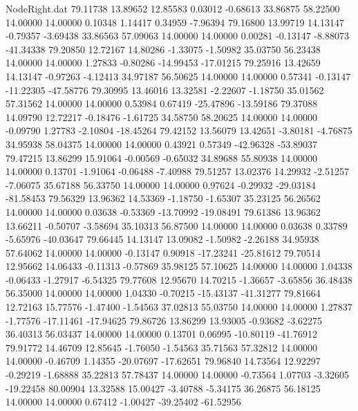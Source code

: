 \begin{filecontents}{NodeRight.dat}
  79.11738   13.89652   12.85583     0.03012   -0.68613   33.86875   58.22500   14.00000   14.00000    0.10348    1.14417    0.34959   -7.96394
  79.16800   13.99719   14.13147    -0.79357   -3.69438   33.86563   57.09063   14.00000   14.00000    0.00281   -0.13147   -8.88073  -41.34338
  79.20850   12.72167   14.80286    -1.33075   -1.50982   35.03750   56.23438   14.00000   14.00000    1.27833   -0.80286  -14.99453  -17.01215
  79.25916   13.42659   14.13147    -0.97263   -4.12413   34.97187   56.50625   14.00000   14.00000    0.57341   -0.13147  -11.22305  -47.58776
  79.30995   13.46016   13.32581    -2.22607   -1.18750   35.01562   57.31562   14.00000   14.00000    0.53984    0.67419  -25.47896  -13.59186
  79.37088   14.09790   12.72217    -0.18476   -1.61725   34.58750   58.20625   14.00000   14.00000   -0.09790    1.27783   -2.10804  -18.45264
  79.42152   13.56079   13.42651    -3.80181   -4.76875   34.95938   58.04375   14.00000   14.00000    0.43921    0.57349  -42.96328  -53.89037
  79.47215   13.86299   15.91064    -0.00569   -0.65032   34.89688   55.80938   14.00000   14.00000    0.13701   -1.91064   -0.06488   -7.40988
  79.51257   13.02376   14.29932    -2.51257   -7.06075   35.67188   56.33750   14.00000   14.00000    0.97624   -0.29932  -29.03184  -81.58453
  79.56329   13.96362   14.53369    -1.18750   -1.65307   35.23125   56.26562   14.00000   14.00000    0.03638   -0.53369  -13.70992  -19.08491
  79.61386   13.96362   13.66211    -0.50707   -3.58694   35.10313   56.87500   14.00000   14.00000    0.03638    0.33789   -5.65976  -40.03647
  79.66445   14.13147   13.09082    -1.50982   -2.26188   34.95938   57.64062   14.00000   14.00000   -0.13147    0.90918  -17.23241  -25.81612
  79.70514   12.95662   14.06433    -0.11313   -0.57869   35.98125   57.10625   14.00000   14.00000    1.04338   -0.06433   -1.27917   -6.54325
  79.77608   12.95670   14.70215    -1.36657   -3.65856   36.48438   56.35000   14.00000   14.00000    1.04330   -0.70215  -15.43137  -41.31277
  79.81664   12.72163   15.77576    -1.47400   -1.54563   37.02813   55.03750   14.00000   14.00000    1.27837   -1.77576  -17.11461  -17.94625
  79.86726   13.86299   13.93005    -0.93682   -3.62275   36.40313   56.03437   14.00000   14.00000    0.13701    0.06995  -10.80119  -41.76912
  79.91772   14.46709   12.85645    -1.76050   -1.54563   35.71563   57.32812   14.00000   14.00000   -0.46709    1.14355  -20.07697  -17.62651
  79.96840   14.73564   12.92297    -0.29219   -1.68888   35.22813   57.78437   14.00000   14.00000   -0.73564    1.07703   -3.32605  -19.22458
  80.00904   13.32588   15.00427    -3.40788   -5.34175   36.26875   56.18125   14.00000   14.00000    0.67412   -1.00427  -39.25402  -61.52956

\end{filecontents}
